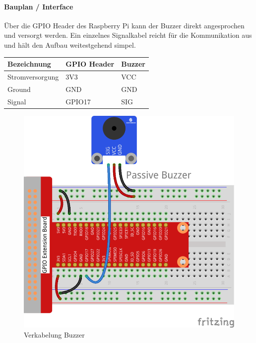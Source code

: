 \documentclass[../../main.tex]{subfiles}
\begin{document}
\paragraph{Bauplan / Interface}

Über die GPIO Header des Raspberry Pi kann der Buzzer direkt angesprochen und versorgt werden. Ein einzelnes Signalkabel reicht für die Kommunikation aus und hält den Aufbau weitestgehend simpel.

\begin{table}[H]
\begin{center}
\begin{tabular}{lll}
\hline
Bezeichnung     & GPIO Header & Buzzer \\ \hline
Stromversorgung & 3V3      & VCC    \\ \hline
Ground          & GND      & GND    \\ \hline
Signal          & GPIO17   & SIG    \\ \hline
\end{tabular}
\end{center}
\end{table}

\begin{figure}[H] \centering
  \includegraphics{VerkabelungAkustik}
  \caption{Verkabelung Buzzer}
  \label{fig:Buzzer}
\end{figure}
\end{document}
